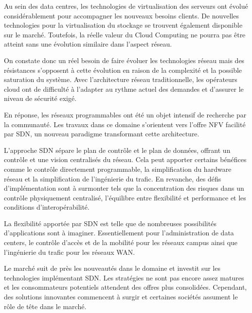 

Au sein des data centres, les technologies de virtualisation des serveurs ont évolué considérablement pour accompagner les nouveaux besoins clients. De nouvelles technologies pour la virtualisation du stockage se trouvent également disponible sur le marché. Toutefois, la réelle valeur du Cloud Computing ne pourra pas être atteint sans une évolution similaire dans l'aspect réseau.

On constate donc un réel besoin de faire évoluer les technologies réseau mais des résistances s'opposent à cette évolution en raison de la complexité et la possible saturation du système. Avec l'architecture réseau traditionnelle, les opérateurs cloud ont de difficulté à l'adapter au rythme actuel des demandes et d'assurer le niveau de sécurité exigé.

En réponse, les réseaux programmables ont été un objet intensif de recherche par la communauté. Les travaux dans ce domaine s'orientent vers l'offre NFV facilité par SDN, un nouveau paradigme transformant cette architecture. 

L'approche SDN sépare le plan de contrôle et le plan de données, offrant un contrôle et une vision centralisés du réseau. Cela peut apporter certains bénéfices comme le contrôle directement programmable, la simplification du hardware réseau et la simplification de l'ingénierie du trafic. En revanche, des défis d'implémentation sont à surmonter tels que la concentration des risques dans un contrôle physiquement centralisé, l'équilibre entre flexibilité et performance et les conditions d'interopérabilité.

La flexibilité apportée par SDN est telle que de nombreuses possibilités d'applications sont à imaginer. Essentiellement pour l'administration de data centers, le contrôle d'accès et de la mobilité pour les réseaux campus ainsi que  l'ingénierie du trafic pour les réseaux WAN.

Le marché suit de près les nouveautés dans le domaine et investit sur les technologies implémentant SDN. Les stratégies ne sont pas encore assez matures et les consommateurs potentiels attendent des offres plus consolidées. Cependant, des solutions innovantes commencent à surgir et certaines sociétés assument le rôle de tête dans le marché.

